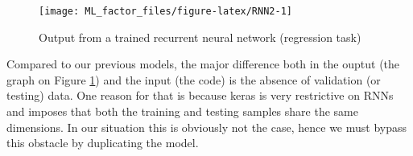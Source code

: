 \documentclass[]{krantz}
\makeatletter
\newenvironment{Shaded}{\begin{snugshade}}{\end{snugshade}}
\newcommand{\CommentTok}[1]{\textcolor[rgb]{0.37,0.37,0.37}{\textit{#1}}}
\newcommand{\DataTypeTok}[1]{\textcolor[rgb]{0.27,0.27,0.27}{#1}}
\newcommand{\DecValTok}[1]{\textcolor[rgb]{0.06,0.06,0.06}{#1}}
\newcommand{\KeywordTok}[1]{\textcolor[rgb]{0.27,0.27,0.27}{\textbf{#1}}}
\newcommand{\NormalTok}[1]{#1}
\newcommand{\OperatorTok}[1]{\textcolor[rgb]{0.43,0.43,0.43}{\textbf{#1}}}
\newcommand{\OtherTok}[1]{\textcolor[rgb]{0.37,0.37,0.37}{#1}}
\newcommand{\StringTok}[1]{\textcolor[rgb]{0.5,0.5,0.5}{#1}}
\newenvironment{kframe}{%
\medskip{}
\setlength{\fboxsep}{.8em}
 \def\at@end@of@kframe{}%
 \ifinner\ifhmode%
  \def\at@end@of@kframe{\end{minipage}}%
  \begin{minipage}{\columnwidth}%
 \fi\fi%
 \def\FrameCommand##1{\hskip\@totalleftmargin \hskip-\fboxsep
 \colorbox{shadecolor}{##1}\hskip-\fboxsep
     \hskip-\linewidth \hskip-\@totalleftmargin \hskip\columnwidth}%
 \MakeFramed {\advance\hsize-\width
   \@totalleftmargin\z@ \linewidth\hsize
   \@setminipage}}%
 {\par\unskip\endMakeFramed%
 \at@end@of@kframe}
\renewenvironment{Shaded}{\begin{kframe}}{\end{kframe}}
\theoremstyle{definition}
\theoremstyle{definition}
\theoremstyle{definition}
\theoremstyle{remark}
\makeatother
\begin{document}
\begin{Shaded}
\end{Shaded}

\begin{figure}[H]

{\centering \texttt{[image: ML\_factor\_files/figure-latex/RNN2-1]} 

}

\caption{Output from a trained recurrent neural network (regression task)}\label{fig:RNN2}
\end{figure}

\normalsize

Compared to our previous models, the major difference both in the ouptut
(the graph on Figure \ref{fig:RNN2}) and the input (the code) is the
absence of validation (or testing) data. One reason for that is because
keras is very restrictive on RNNs and imposes that both the training and
testing samples share the same dimensions. In our situation this is
obviously not the case, hence we must bypass this obstacle by
duplicating the model.

\footnotesize

\begin{Shaded}
\end{Shaded}
\end{document}

